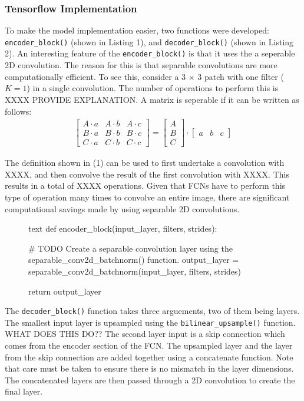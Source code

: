 \documentclass[a4paper]{article}
\begin{document}
\subsubsection{Tensorflow Implementation}
To make the model implementation easier, two functions were developed: \verb|encoder_block()| (shown in Listing 1), and \verb|decoder_block()| (shown in Listing 2). An interesting feature of the \verb|encoder_block()| is that it uses the a seperable 2D convolution. The reason for this is that separable convolutions are more computationally efficient. To see this, consider a 3 $\times$ 3 patch with one filter ($K = 1$) in a single convolution. The number of operations to perform this is XXXX PROVIDE EXPLANATION. A matrix is seperable if it can be written as follows:
\begin{align}
\begin{bmatrix}
A \cdot a & A \cdot b & A \cdot c\\
B \cdot a & B \cdot b & B \cdot c\\
C \cdot a & C \cdot b & C \cdot c
\end{bmatrix}
=
\begin{bmatrix}
A\\
B\\
C
\end{bmatrix}
\cdot
\begin{bmatrix}
a & b & c
\end{bmatrix}
\end{align}  

The definition shown in (1) can be used to first undertake a convolution with XXXX, and then convolve the result of the first convolution with XXXX. This results in a total of XXXX operations. Given that FCNs have to perform this type of operation many times to convolve an entire image, there are significant computational savings made by using separable 2D convolutions.
   
\begin{figure}[h]\scriptsize
\begin{sexylisting}{text}
def encoder_block(input_layer, filters, strides):
    
    # TODO Create a separable convolution layer using the separable_conv2d_batchnorm() function.
    output_layer = separable_conv2d_batchnorm(input_layer, filters, strides)
    
    return output_layer
\end{sexylisting}
\end{figure}

The \verb|decoder_block()| function takes three arguements, two of them being layers. The smallest input layer is upsampled using the \verb|bilinear_upsample()| function. WHAT DOES THIS DO?? The second layer input is a skip connection which comes from the encoder section of the FCN. The upsampled layer and the layer from the skip connection are added together using a concatenate function. Note that care must be taken to ensure there is no mismatch in the layer dimensions. The concatenated layers are then passed through a 2D convolution to create the final layer.  
\end{document}
